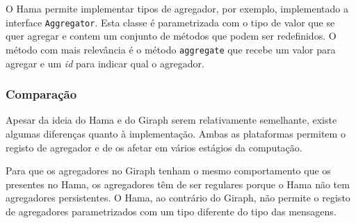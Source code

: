     O Hama permite implementar tipos de agregador, por exemplo, implementado 
a interface \texttt{Aggregator}.
    Esta classe é parametrizada com o tipo de valor que se quer agregar e contem 
um conjunto de métodos que podem ser redefinidos.
    O método com mais relevância é o método \texttt{aggregate} que recebe um 
valor para agregar e um \textit{id} para indicar qual o agregador.

  \subsubsection*{Comparação}
  
  Apesar da ideia do Hama e do Giraph serem relativamente semelhante, existe algumas diferenças quanto à implementação. Ambas as plataformas
  permitem o registo de agregador e de os afetar em vários estágios da computação. 
  
  Para que os agregadores no Giraph tenham o mesmo comportamento que os presentes no Hama, os agregadores têm de ser regulares porque o Hama não tem agregadores persistentes. O Hama, ao contrário do Giraph, não permite o registo de agregadores parametrizados com um tipo diferente do tipo das mensagens.
  
